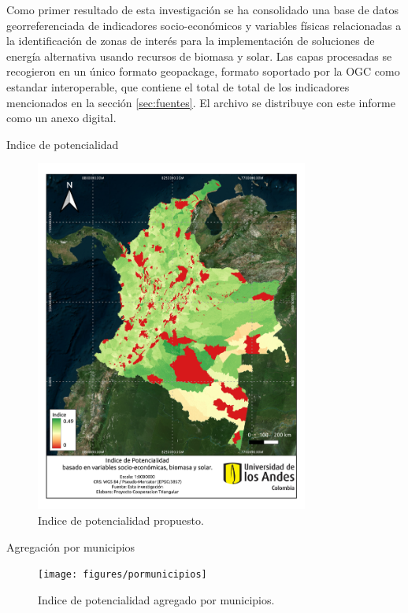 
Como primer resultado de esta investigación se ha consolidado una base de datos georreferenciada de indicadores socio-económicos y variables físicas relacionadas a la identificación
de zonas de interés para la implementación de soluciones de energía alternativa usando recursos de biomasa y solar.  Las capas procesadas se recogieron en un
único formato geopackage, formato soportado por la OGC como estandar interoperable, que contiene el total de total de los indicadores mencionados en la sección
\ref{sec:fuentes}.  El archivo se distribuye con este informe como un anexo digital.

Indice de potencialidad
\begin{figure}
    \centering
    \includegraphics[width=0.8\textwidth]{figures/indice}
    \caption{Indice de potencialidad propuesto.}
    \label{fig:indice}
\end{figure}

Agregación por municipios
\begin{figure}
    \centering
    \texttt{[image: figures/pormunicipios]}
    \caption{Indice de potencialidad agregado por municipios.}
    \label{fig:pormunicipios}
\end{figure}

